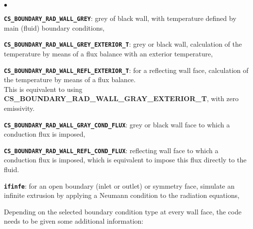 \begin{list}{$\bullet$}{}

\item \texttt{\textbf{CS\_BOUNDARY\_RAD\_WALL\_GREY}}: grey of black wall, with
      temperature defined by main (fluid) boundary conditions,

\item \texttt{\textbf{CS\_BOUNDARY\_RAD\_WALL\_GREY\_EXTERIOR\_T}}:
       grey or black wall, calculation of the temperature by means of a flux balance
       with an exterior temperature,

\item \texttt{\textbf{CS\_BOUNDARY\_RAD\_WALL\_REFL\_EXTERIOR\_T}}:
      for a reflecting wall face, calculation of the
      temperature by means of a flux balance.\\
      This is equivalent to using \textbf{CS\_BOUNDARY\_RAD\_WALL\_GRAY\_EXTERIOR\_T},
      with zero emissivity.

\item \texttt{\textbf{CS\_BOUNDARY\_RAD\_WALL\_GRAY\_COND\_FLUX}}:
      grey or black wall face to which a conduction
      flux is imposed,

\item \texttt{\textbf{CS\_BOUNDARY\_RAD\_WALL\_REFL\_COND\_FLUX}}:
      reflecting wall face to which a conduction
      flux is imposed, which is equivalent to impose this flux directly
      to the fluid.

\item \texttt{\textbf{ifinfe}}: for an open boundary (inlet or outlet) or symmetry face,
      simulate an infinite extrusion by applying a Neumann condition to
      the radiation equations,

\end{list}

\noindent
Depending on the selected boundary condition type at every wall face,
the code needs to be given some additional information:

